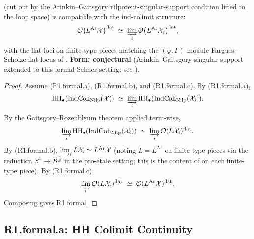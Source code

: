 \begin{theorem}
\begin{itemize}
(cut out by the Arinkin--Gaitsgory nilpotent-singular-support
condition lifted to the loop space) is compatible with the
ind-colimit structure:
\begin{equation}
\mathcal{O}\bigl(L^{\mathrm{Ar}}\mathcal{X}\bigr)^{\mathrm{flat}}\;\simeq\;\varinjlim_{i}\mathcal{O}\bigl(L^{\mathrm{Ar}}\mathcal{X}_{i}\bigr)^{\mathrm{flat}},
\end{equation}
with the flat loci on finite-type pieces matching the
\((\varphi,\Gamma)\)-module Fargues--Scholze flat locus of
.
\textbf{Form: conjectural} (Arinkin--Gaitsgory singular support
extended to this formal Selmer setting; see
).
\end{itemize}
\end{theorem}

\begin{proof}
Assume (R1.formal.a), (R1.formal.b), and (R1.formal.c). By
(R1.formal.a),
\begin{equation}
\mathrm{HH}_{\bullet}(\mathrm{IndCoh}_{\mathrm{Nilp}}(\mathcal{X}))\;\simeq\;\varinjlim_{i}\mathrm{HH}_{\bullet}(\mathrm{IndCoh}_{\mathrm{Nilp}}(\mathcal{X}_{i})).
\end{equation}
By the Gaitsgory--Rozenblyum theorem applied term-wise,
\begin{equation}
\varinjlim_{i}\mathrm{HH}_{\bullet}(\mathrm{IndCoh}_{\mathrm{Nilp}}(\mathcal{X}_{i}))\;\simeq\;\varinjlim_{i}\mathcal{O}(L\mathcal{X}_{i})^{\mathrm{flat}}.
\end{equation}
By (R1.formal.b),
\(\varinjlim_{i}L\mathcal{X}_{i}\simeq L^{\mathrm{Ar}}\mathcal{X}\)
(noting \(L=L^{\mathrm{Ar}}\) on finite-type pieces via the
reduction \(S^{1}\to B\widehat{\mathbb{Z}}\) in the pro-\'etale
setting; this is the content of
 on each finite-type
piece). By (R1.formal.c),
\begin{equation}
\varinjlim_{i}\mathcal{O}(L\mathcal{X}_{i})^{\mathrm{flat}}\;\simeq\;\mathcal{O}(L^{\mathrm{Ar}}\mathcal{X})^{\mathrm{flat}}.
\end{equation}
Composing gives R1.formal.
\end{proof}

\subsection{R1.formal.a: HH Colimit Continuity}

